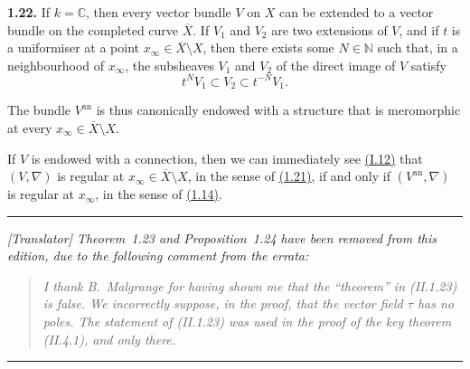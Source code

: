 \documentclass{report}
\newenvironment{itenv}[1]
  {\phantomsection\par\medskip\noindent\textbf{#1.}\itshape}
  {\par\medskip}
\newenvironment{rmenv}[1]
  {\phantomsection\par\medskip\noindent\textbf{#1.}\rmfamily}
  {\par\medskip}
\newcommand{\CC}{\mathbb{C}}
\newcommand{\NN}{\mathbb{N}}
\newcommand{\an}{\mathrm{an}}
\newcommand{\oldpage}[1]{\marginpar{\footnotesize$\Big\vert$ \textit{p.~#1}}}
\begin{document}
\begin{rmenv}{1.22}
\label{II.1.22}
  If $k=\CC$, then every vector bundle $V$ on $X$ can be extended to a vector bundle on the completed curve $\overline{X}$.
  If $V_1$ and $V_2$ are two extensions of $V$, and if $t$ is a uniformiser at a point $x_\infty\in\overline{X}\setminus X$, then there exists some $N\in\NN$ such that, in a neighbourhood of $x_\infty$, the subsheaves $V_1$ and $V_2$ of the direct image of $V$
\oldpage{58}
  satisfy
  \[
    t^N V_1\subset V_2 \subset t^{-N}V_1.
  \]

  The bundle $V^\an$ is thus canonically endowed with a structure that is meromorphic at every $x_\infty\in\overline{X}\setminus X$.

  If $V$ is endowed with a connection, then we can immediately see \hyperref[II.1.12]{(I.12)} that $(V,\nabla)$ is regular at $x_\infty\in\overline{X}\setminus X$, in the sense of \hyperref[II.1.21]{(1.21)}, if and only if $(V^\an,\nabla)$ is regular at $x_\infty$, in the sense of \hyperref[II.1.14]{(1.14)}.
\end{rmenv}

\medskip
\hrule
\medskip

\emph{[Translator] Theorem~1.23 and Proposition~1.24 have been removed from this edition, due to the following comment from the errata:}
\begin{quote}
  \itshape
  I thank B.~Malgrange for having shown me that the ``theorem'' in (II.1.23) is false.
  We incorrectly suppose, in the proof, that the vector field $\tau$ has no poles.
  The statement of (II.1.23) was used in the proof of the key theorem (II.4.1), and only there.
\end{quote}

\medskip
\hrule
\medskip


\end{document}
